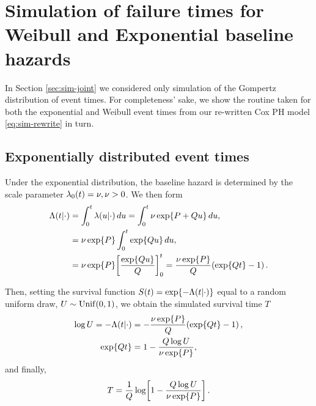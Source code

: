 \section{Simulation of failure times for Weibull and Exponential baseline hazards}\label{sec:appendix-survtimes}
In Section \ref{sec:sim-joint} we considered only simulation of the Gompertz distribution of event times. For completeness' sake, we show the routine taken for both the exponential and Weibull event times from our re-written Cox PH model \eqref{eq:sim-rewrite} in turn.
\subsection*{Exponentially distributed event times}
Under the exponential distribution, the baseline hazard is determined by the scale parameter $\lambda_0(t)=\nu,\nu>0$. We then form
\begin{align*}
    \Lambda\lb t|\cdot\rb&=\int_0^t\lambda\lb u|\cdot\rb du=\int_0^t\nu\exp\lbr P + Qu\rbr du,\\
    &=\nu\exp\lbr P\rbr\int_0^t\exp\lbr Qu\rbr du,\\
    &=\nu\exp\lbr P\rbr\ls\frac{\exp\lbr Qu\rbr}{Q}\rs_0^t=\frac{\nu\exp\lbr P\rbr}{Q}\lb\exp\lbr Qt\rbr -1\rb.
\end{align*}

Then, setting the survival function $S(t)=\exp\!\left\{-\Lambda\!\left( t|\cdot\right)\right\}$ equal to a random uniform draw, $U\sim \mathrm{Unif}\!\left( 0, 1\right)$, we obtain the simulated survival time $T$
\begin{align*}
    \log U=-\Lambda\!\left( t|\cdot\right)&=-\frac{\nu\exp\!\left\{ P\right\}}{Q}\!\left(\exp\!\left\{ Qt\right\} -1\right),\nonumber \\
    \exp\!\left\{ Qt\right\} &= 1 - \frac{Q\log U}{\nu\exp\!\left\{ P \right\}}, \nonumber\\
\end{align*}
and finally, 
\begin{align}
    T=\frac{1}{Q}\log\!\left[1 - \frac{Q\log U}{\nu\exp\!\left\{ P \right\}}\right].
\end{align}
